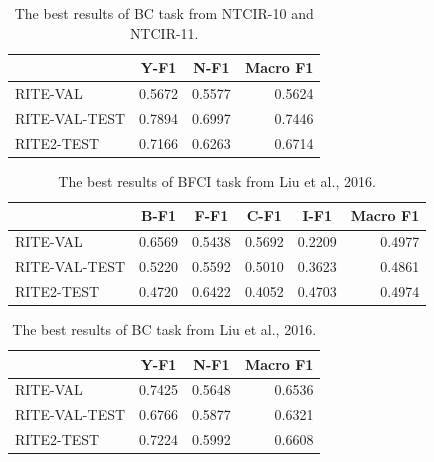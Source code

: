 \documentclass[12pt]{article}
\begin{document}
\begin{CJK*}{UTF8}{bkai}
\begin{spacing}{1.77}
\begin{table}[H]
  \centering
  \setlength{\extrarowheight}{-3pt}
  \begin{tabular}{|l|r|r|r|}
  \hline
   & \multicolumn{1}{c|}{Y-F1} & \multicolumn{1}{c|}{N-F1} & \multicolumn{1}{c|}{Macro F1} \\ \hline
  RITE-VAL & 0.5672 & 0.5577 & 0.5624 \\ \hline
  RITE-VAL-TEST & 0.7894 & 0.6997 & 0.7446 \\ \hline
  RITE2-TEST & 0.7166 & 0.6263 & 0.6714 \\ \hline
  \end{tabular}
  \caption{The best results of BC task from NTCIR-10 and NTCIR-11.}
  \label{result:bc_ntcir}
\end{table}

\begin{table}[H]
  \centering
  \setlength{\extrarowheight}{-3pt}
  \begin{tabular}{|l|r|r|r|r|r|}
  \hline
   & \multicolumn{1}{c|}{B-F1} & \multicolumn{1}{c|}{F-F1} & \multicolumn{1}{c|}{C-F1} & \multicolumn{1}{c|}{I-F1} & \multicolumn{1}{c|}{Macro F1} \\ \hline
  RITE-VAL & 0.6569 & 0.5438 & 0.5692 & 0.2209 & 0.4977 \\ \hline
  RITE-VAL-TEST & 0.5220 & 0.5592 & 0.5010 & 0.3623 & 0.4861 \\ \hline
  RITE2-TEST & 0.4720 & 0.6422 & 0.4052 & 0.4703 & 0.4974 \\ \hline
  \end{tabular}
  \caption{The best results of BFCI task from Liu et al., 2016.}
  \label{result:bfci_liu_2016}
\end{table}

\begin{table}[H]
  \centering
  \setlength{\extrarowheight}{-3pt}
  \begin{tabular}{|l|r|r|r|}
  \hline
   & \multicolumn{1}{c|}{Y-F1} & \multicolumn{1}{c|}{N-F1} & \multicolumn{1}{c|}{Macro F1} \\ \hline
  RITE-VAL & 0.7425 & 0.5648 & 0.6536 \\ \hline
  RITE-VAL-TEST & 0.6766 & 0.5877 & 0.6321 \\ \hline
  RITE2-TEST & 0.7224 & 0.5992 & 0.6608 \\ \hline
  \end{tabular}
  \caption{The best results of BC task from Liu et al., 2016.}
  \label{result:bc_liu_2016}
\end{table}


\end{spacing}
\end{CJK*}
\end{document}

